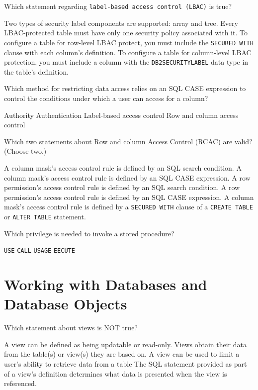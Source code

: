 \documentclass[11pt]{exam}
\begin{document}
\begin{questions}
\question[1]
Which statement regarding \texttt{label-based access control (LBAC)} is true?
\begin{choices}
\choice Two types of security label components are supported: array and tree.
\choice Every LBAC-protected table must have only one security policy associated with it.
\choice To configure a table for row-level LBAC protect, you must include the \texttt{SECURED WITH}
clause with each column's definition.
\choice To configure a table for column-level LBAC protection, you must include a column with the
\texttt{DB2SECURITYLABEL} data type in the table's definition.
\end{choices}

\newpage

\question[1]
Which method for restricting data access relies on an SQL CASE expression to control the conditions
under which a user can access for a column?
\begin{choices}
\choice Authority
\choice Authentication
\choice Label-based access control
\choice Row and column access control
\end{choices}

\question[1]
Which two statements about Row and column Access Control (RCAC) are valid? (Choose two.)
\begin{choices}
\choice A column mask's access control rule is defined by an SQL search condition.
\choice A column mask's access control rule is defined by an SQL CASE expression.
\choice A row permission's access control rule is defined by an SQL search condition.
\choice A row permission's access control rule is defined by an SQL CASE expression.
\choice A column mask's access control rule is defined by a \texttt{SECURED WITH} clause of 
a \texttt{CREATE TABLE} or \texttt{ALTER TABLE} statement.
\end{choices}

\question[1]
Which privilege is needed to invoke a stored procedure?
\begin{choices}
\choice \texttt{USE}
\choice \texttt{CALL}
\choice \texttt{USAGE}
\choice \texttt{EECUTE}
\end{choices}

\newpage
\section{Working with Databases and Database Objects}
\question[1]
Which statement about views is NOT true?
\begin{choices}
\choice A view can be defined as being updatable or read-only.
\choice Views obtain their data from the table(s) or view(s) they are based on.
\choice A view can be used to limit a user's ability to retrieve data from a table
\choice The SQL statement provided as part of a view's definition determines what data is 
presented when the view is referenced.
\end{choices}


\end{questions}
\end{document}
